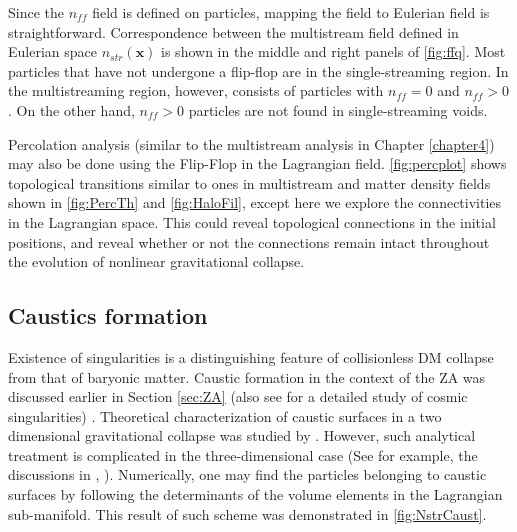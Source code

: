 Since the $n_{ff}$ field is defined on particles, mapping the field to Eulerian field is straightforward. Correspondence between the multistream field defined in Eulerian space $n_{str}(\mathbf{x})$ is shown in the middle and right panels of \autoref{fig:ffq}. Most particles that have not undergone a flip-flop are in the single-streaming region. In the multistreaming region, however, consists of particles with $n_{ff} = 0$ and $n_{ff} > 0$. On the other hand, $n_{ff} > 0$ particles are not found in single-streaming voids. 

Percolation analysis (similar to the multistream analysis in Chapter \ref{chapter4}) may also be done using the Flip-Flop in the Lagrangian field. \autoref{fig:percplot} shows topological transitions similar to ones in multistream and matter density fields shown in \autoref{fig:PercTh} and \autoref{fig:HaloFil}, except here we explore the connectivities in the Lagrangian space. This could reveal topological connections in the initial positions, and reveal whether or not the connections remain intact throughout the evolution of nonlinear gravitational collapse. 





\subsection{Caustics formation}



Existence of singularities is a distinguishing feature of collisionless DM collapse from that of baryonic matter. Caustic formation in the context of the ZA \cite{Zeldovich1970} was discussed earlier in Section \ref{sec:ZA} (also see \cite{Shandarin1989} for a detailed study of cosmic singularities) . Theoretical characterization of caustic surfaces in a two dimensional gravitational collapse was studied by \citep{Arnold1982}. However, such analytical treatment is complicated in the three-dimensional case (See for example, the discussions in \citealt{Hidding2014}, \citealt{Feldbrugge2018}). Numerically, one may find the particles belonging to caustic surfaces by following the determinants of the volume elements in the Lagrangian sub-manifold. This result of such scheme was demonstrated in \autoref{fig:NstrCaust}.

